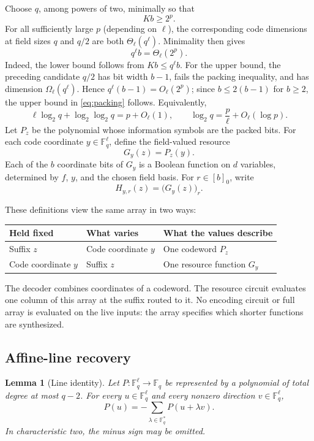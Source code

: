 \documentclass[11pt]{article}
\newtheorem{lemma}[lemma]{Lemma}
\newcommand{\F}{\mathbb{F}}
\begin{document}
Choose $q$, among powers of two, minimally so that
\[
  Kb\ge2^p.
\]
For all sufficiently large $p$ (depending on $\ell$), the corresponding code
dimensions at field sizes $q$ and $q/2$ are both $\Theta_\ell(q^\ell)$.
Minimality then gives
\begin{equation}\label{eq:packing}
  q^\ell b=\Theta_\ell(2^p).
\end{equation}
Indeed, the lower bound follows from $Kb\le q^\ell b$.  For the upper bound,
the preceding candidate $q/2$ has bit width $b-1$, fails the packing
inequality, and has dimension $\Omega_\ell(q^\ell)$.  Hence
$q^\ell(b-1)=O_\ell(2^p)$; since $b\le2(b-1)$ for $b\ge2$, the upper bound in
\eqref{eq:packing} follows.  Equivalently,
\begin{equation}\label{eq:q-log}
  \ell\log_2 q+\log_2\log_2 q=p+O_\ell(1),
  \qquad
  \log_2q=\frac p\ell+O_\ell(\log p).
\end{equation}
Let $P_z$ be the polynomial whose information symbols are the packed bits.
For each code coordinate $y\in\F_q^\ell$, define
the field-valued resource
\[
  G_y(z)=P_z(y).
\]
Each of the $b$ coordinate bits of $G_y$ is a Boolean function on $d$
variables, determined by $f$, $y$, and the chosen field basis.
For $r\in[b]_0$, write
\[
  H_{y,r}(z)=\bigl(G_y(z)\bigr)_r.
\]

These definitions view the same array in two ways:
\begin{center}
\begin{tabular}{@{}lll@{}}
\toprule
Held fixed & What varies & What the values describe \\
\midrule
Suffix $z$ & Code coordinate $y$ & One codeword $P_z$ \\
Code coordinate $y$ & Suffix $z$ & One resource function $G_y$ \\
\bottomrule
\end{tabular}
\end{center}
The decoder combines coordinates of a codeword.  The resource circuit
evaluates one column of this array at the suffix routed to it.  No encoding
circuit or full array is evaluated on the live inputs: the array specifies
which shorter functions are synthesized.

\subsection{Affine-line recovery}

\begin{lemma}[Line identity]\label{lem:line}
Let $P:\F_q^\ell\to\F_q$ be represented by a polynomial of total degree at
most $q-2$.  For every $u\in\F_q^\ell$ and every nonzero direction
$v\in\F_q^\ell$,
\[
  P(u)=-\sum_{\lambda\in\F_q^*}P(u+\lambda v).
\]
In characteristic two, the minus sign may be omitted.
\end{lemma}
\end{document}
